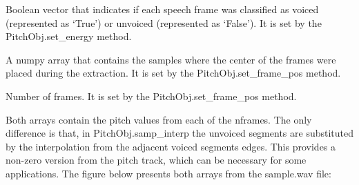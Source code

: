 \documentclass[letterpaper,10pt,english]{sphinxmanual}
\begin{document}

\begin{fulllineitems}
\label{pYAAPT:PitchObj.vuv}
Boolean vector that indicates if each speech frame was classified as voiced (represented as `True') or unvoiced (represented as `False'). It is set by the PitchObj.set\_energy method.

\end{fulllineitems}


\begin{fulllineitems}
\label{pYAAPT:PitchObj.frames_pos}
A numpy array that contains the samples where the center of the frames were placed during the extraction. It is set by the PitchObj.set\_frame\_pos method.

\end{fulllineitems}


\begin{fulllineitems}
\label{pYAAPT:PitchObj.nframes}
Number of frames. It is set by the PitchObj.set\_frame\_pos method.

\end{fulllineitems}


\begin{fulllineitems}
\label{pYAAPT:PitchObj.samp_values}\label{pYAAPT:PitchObj.samp_interp}
Both arrays contain the pitch values from each of the nframes. The only difference is that, in PitchObj.samp\_interp the unvoiced segments are substituted by the interpolation from the adjacent voiced segments edges. This provides a non-zero version from the pitch track, which can be necessary for some applications. The figure below presents both arrays from the sample.wav file:

\end{fulllineitems}
\end{document}

